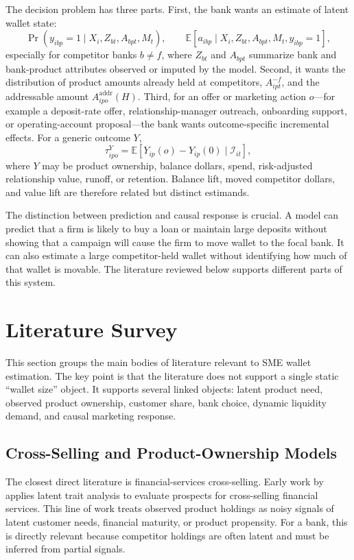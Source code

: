 \documentclass[11pt]{article}
\begin{document}
The decision problem has three parts. First, the bank wants an estimate of
latent wallet state:
\[
  \Pr(y_{ibp}=1 \mid X_i,Z_{bt},A_{bpt},M_t), \qquad
  \mathbb{E}[a_{ibp} \mid X_i,Z_{bt},A_{bpt},M_t,y_{ibp}=1],
\]
especially for competitor banks $b \neq f$, where $Z_{bt}$ and $A_{bpt}$
summarize bank and bank-product attributes observed or imputed by the model.
Second, it wants the distribution of product amounts already held at
competitors, $A_{ipt}^{-f}$, and the addressable amount
$A_{ipo}^{\mathrm{addr}}(H)$. Third, for an offer or marketing action
$o$---for example a deposit-rate offer, relationship-manager outreach,
onboarding support, or operating-account proposal---the bank wants
outcome-specific incremental effects. For a generic outcome $Y$,
\[
  \tau_{ipo}^{Y}
  =
  \mathbb{E}[Y_{ip}(o)-Y_{ip}(0)\mid \mathcal{I}_{it}],
\]
where $Y$ may be product ownership, balance dollars, spend, risk-adjusted
relationship value, runoff, or retention. Balance lift, moved competitor
dollars, and value lift are therefore related but distinct estimands.

The distinction between prediction and causal response is crucial. A model can
predict that a firm is likely to buy a loan or maintain large deposits without
showing that a campaign will cause the firm to move wallet to the focal bank.
It can also estimate a large competitor-held wallet without identifying how much
of that wallet is movable. The literature reviewed below supports different
parts of this system.

\section{Literature Survey}

This section groups the main bodies of literature relevant to SME wallet
estimation. The key point is that the literature does not support a single
static ``wallet size'' object. It supports several linked objects: latent
product need, observed product ownership, customer share, bank choice, dynamic
liquidity demand, and causal marketing response.

\subsection{Cross-Selling and Product-Ownership Models}

The closest direct literature is financial-services cross-selling. Early work
by \citet{kamakura1991latent} applies latent trait analysis to evaluate
prospects for cross-selling financial services. This line of work treats
observed product holdings as noisy signals of latent customer needs, financial
maturity, or product propensity. For a bank, this is directly relevant because
competitor holdings are often latent and must be inferred from partial signals.
\end{document}
